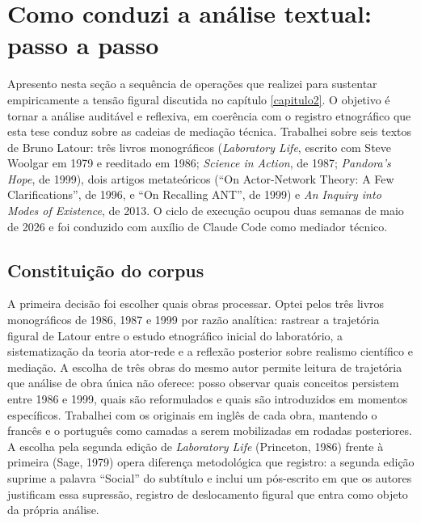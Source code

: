 
\section{Como conduzi a análise textual: passo a passo}
\label{sec:metodo-analise-figuracoes}

Apresento nesta seção a sequência de operações que realizei para sustentar empiricamente a tensão figural discutida no capítulo \ref{capitulo2}. O objetivo é tornar a análise auditável e reflexiva, em coerência com o registro etnográfico que esta tese conduz sobre as cadeias de mediação técnica. Trabalhei sobre seis textos de Bruno Latour: três livros monográficos (\emph{Laboratory Life}, escrito com Steve Woolgar em 1979 e reeditado em 1986; \emph{Science in Action}, de 1987; \emph{Pandora's Hope}, de 1999), dois artigos metateóricos (\enquote{On Actor-Network Theory: A Few Clarifications}, de 1996, e \enquote{On Recalling ANT}, de 1999) e \emph{An Inquiry into Modes of Existence}, de 2013. O ciclo de execução ocupou duas semanas de maio de 2026 e foi conduzido com auxílio de Claude Code como mediador técnico.

\subsection{Constituição do corpus}

A primeira decisão foi escolher quais obras processar. Optei pelos três livros monográficos de 1986, 1987 e 1999 por razão analítica: rastrear a trajetória figural de Latour entre o estudo etnográfico inicial do laboratório, a sistematização da teoria ator-rede e a reflexão posterior sobre realismo científico e mediação. A escolha de três obras do mesmo autor permite leitura de trajetória que análise de obra única não oferece: posso observar quais conceitos persistem entre 1986 e 1999, quais são reformulados e quais são introduzidos em momentos específicos. Trabalhei com os originais em inglês de cada obra, mantendo o francês e o português como camadas a serem mobilizadas em rodadas posteriores. A escolha pela segunda edição de \emph{Laboratory Life} (Princeton, 1986) frente à primeira (Sage, 1979) opera diferença metodológica que registro: a segunda edição suprime a palavra \enquote{Social} do subtítulo e inclui um pós-escrito em que os autores justificam essa supressão, registro de deslocamento figural que entra como objeto da própria análise.

